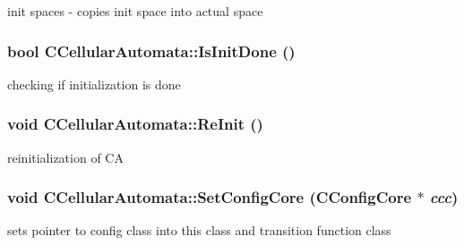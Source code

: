\label{classCCellularAutomata_ab1df4fc7a5d32eed82d62e99aaec3f1f}
init spaces -\/ copies init space into actual space \hypertarget{classCCellularAutomata_a1818fe798c2bbcd3028b6dbe6f671965}{
\subsubsection[{IsInitDone}]{\setlength{\rightskip}{0pt plus 5cm}bool CCellularAutomata::IsInitDone ()}}
\label{classCCellularAutomata_a1818fe798c2bbcd3028b6dbe6f671965}
checking if initialization is done \hypertarget{classCCellularAutomata_ade3b43b44d2e2cc448d5c896ae389957}{
\subsubsection[{ReInit}]{\setlength{\rightskip}{0pt plus 5cm}void CCellularAutomata::ReInit ()}}
\label{classCCellularAutomata_ade3b43b44d2e2cc448d5c896ae389957}
reinitialization of CA \hypertarget{classCCellularAutomata_a0ba78441e4834407637d70e5ccf98e79}{
\subsubsection[{SetConfigCore}]{\setlength{\rightskip}{0pt plus 5cm}void CCellularAutomata::SetConfigCore ({\bf CConfigCore} $\ast$ {\em ccc})}}
\label{classCCellularAutomata_a0ba78441e4834407637d70e5ccf98e79}
sets pointer to config class into this class and transition function class


